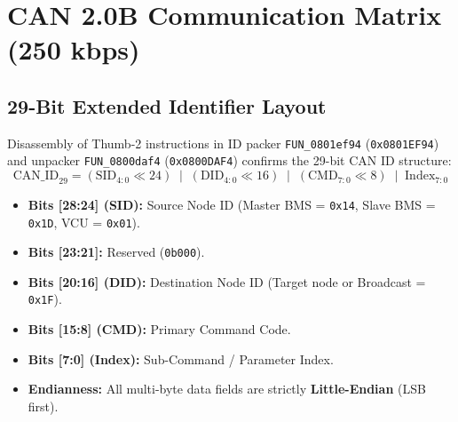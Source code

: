 \documentclass[10pt,a4paper]{article}
\begin{document}
\section{CAN 2.0B Communication Matrix (250 kbps)}

\subsection{29-Bit Extended Identifier Layout}
Disassembly of Thumb-2 instructions in ID packer \texttt{FUN\_0801ef94} (\texttt{0x0801EF94}) and unpacker \texttt{FUN\_0800daf4} (\texttt{0x0800DAF4}) confirms the 29-bit CAN ID structure:
\begin{equation}
    \text{CAN\_ID}_{29} = (\text{SID}_{4:0} \ll 24) \;\mid\; (\text{DID}_{4:0} \ll 16) \;\mid\; (\text{CMD}_{7:0} \ll 8) \;\mid\; \text{Index}_{7:0}
\end{equation}
\begin{itemize}
    \item \textbf{Bits [28:24] (SID):} Source Node ID (Master BMS = \texttt{0x14}, Slave BMS = \texttt{0x1D}, VCU = \texttt{0x01}).
    \item \textbf{Bits [23:21]:} Reserved (\texttt{0b000}).
    \item \textbf{Bits [20:16] (DID):} Destination Node ID (Target node or Broadcast = \texttt{0x1F}).
    \item \textbf{Bits [15:8] (CMD):} Primary Command Code.
    \item \textbf{Bits [7:0] (Index):} Sub-Command / Parameter Index.
    \item \textbf{Endianness:} All multi-byte data fields are strictly \textbf{Little-Endian} (LSB first).
\end{itemize}
\end{document}
